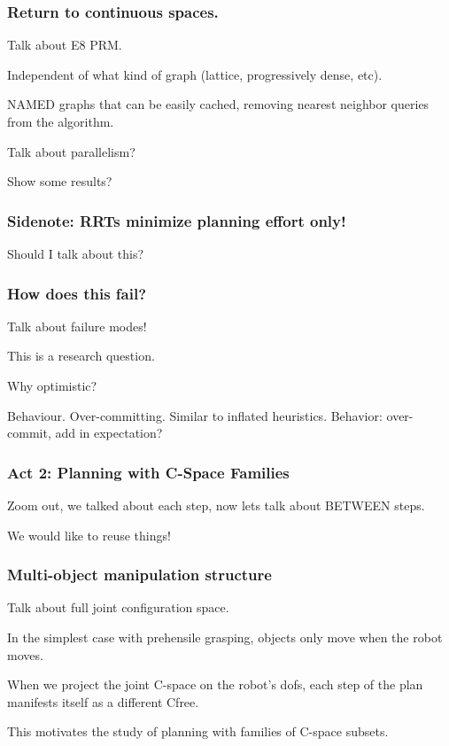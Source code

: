 \documentclass[serif]{beamer}
\begin{document}
\begin{frame}
   \frametitle{Return to continuous spaces.}

   Talk about E8 PRM.
   
   Independent of what kind of graph (lattice,
   progressively dense, etc).
   
   NAMED graphs that can be easily cached,
   removing nearest neighbor queries from the algorithm.
   
   Talk about parallelism?
   
   Show some results?
\end{frame}

\begin{frame}
   \frametitle{Sidenote: RRTs minimize planning effort only!}
   
   Should I talk about this?
\end{frame}

\begin{frame}
   \frametitle{How does this fail?}
   
   Talk about failure modes!
   
   This is a research question.
   
   Why optimistic?
   
   Behaviour.  Over-committing.  Similar to inflated heuristics.
   Behavior: over-commit, add in expectation?
\end{frame}

\begin{frame}
   \frametitle{Act 2: Planning with C-Space Families}
   
   Zoom out, we talked about each step,
   now lets talk about BETWEEN steps.
   
   We would like to reuse things!
\end{frame}

\begin{frame}
   \frametitle{Multi-object manipulation structure}
   
   Talk about full joint configuration space.
   
   In the simplest case with prehensile grasping,
   objects only move when the robot moves.
   
   When we project the joint C-space on the robot's dofs,
   each step of the plan manifests itself as a different Cfree.
   
   This motivates the study of planning with families of C-space subsets.
\end{frame}
\end{document}
